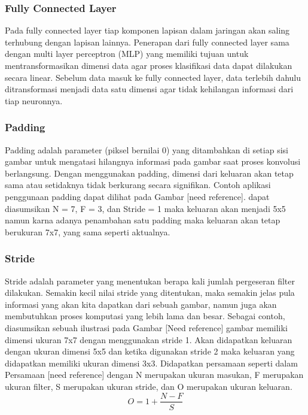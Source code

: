 \subsubsection{Fully Connected Layer}
Pada fully connected layer tiap komponen lapisan dalam jaringan akan saling terhubung dengan lapisan lainnya. Penerapan dari fully connected layer sama dengan multi layer perceptron (MLP) yang memiliki tujuan untuk mentransformasikan dimensi data agar proses klasifikasi data dapat dilakukan secara linear. Sebelum data masuk ke fully connected layer, data terlebih dahulu ditransformasi menjadi data satu dimensi agar tidak kehilangan informasi dari tiap neuronnya.

\subsubsection{Padding}
Padding adalah parameter (piksel bernilai 0) yang ditambahkan di setiap sisi gambar untuk mengatasi hilangnya informasi pada gambar saat proses konvolusi berlangsung. Dengan menggunakan padding, dimensi dari keluaran akan tetap sama atau setidaknya tidak berkurang secara signifikan. Contoh aplikasi penggunaan padding dapat dilihat pada Gambar [need reference]. dapat diasumsikan N = 7, F = 3, dan Stride = 1 maka keluaran akan menjadi 5x5 namun karna adanya penambahan satu padding maka keluaran akan tetap berukuran 7x7, yang sama seperti aktualnya.

\subsubsection{Stride}
Stride adalah parameter yang menentukan berapa kali jumlah pergeseran filter dilakukan. Semakin kecil nilai stride yang ditentukan, maka semakin jelas pula informasi yang akan kita dapatkan dari sebuah gambar, namun juga akan membutuhkan proses komputasi yang lebih lama dan besar. Sebagai contoh, diasumsikan sebuah ilustrasi pada Gambar [Need reference] gambar memiliki dimensi ukuran 7x7 dengan menggunakan stride 1. Akan didapatkan keluaran dengan ukuran dimensi 5x5 dan ketika digunakan stride 2 maka keluaran yang didapatkan memiliki ukuran dimensi 3x3. Didapatkan persamaan seperti dalam Persamaan [need reference] dengan N merupakan ukuran masukan, F merupakan ukuran filter, S merupakan ukuran stride, dan O merupakan ukuran keluaran.
\begin{equation}
	\label{eq:stride}
	O = 1 +\frac{N-F}{S}
\end{equation}


